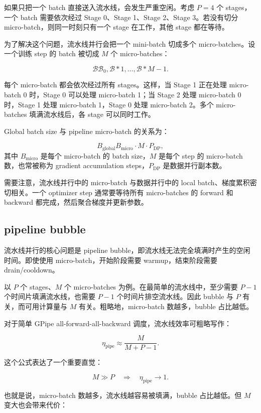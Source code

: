 如果只把一个 batch 直接送入流水线，会发生严重空闲。考虑 $P=4$ 个 stages，一个 batch 需要依次经过 Stage 0、Stage 1、Stage 2、Stage 3。若没有切分 micro-batch，则同一时刻只有一个 stage 在工作，其他 stage 都在等待。

为了解决这个问题，流水线并行会把一个 mini-batch 切成多个 micro-batches。设一个训练 step 的 batch 被切成 $M$ 个 micro-batches：

\[
\mathcal{B}
{\mathcal{B}_0,\mathcal{B}*1,\ldots,\mathcal{B}*{M-1}}.
\]

每个 micro-batch 都会依次经过所有 stages。这样，当 Stage 1 正在处理 micro-batch 0 时，Stage 0 可以处理 micro-batch 1；当 Stage 2 处理 micro-batch 0 时，Stage 1 处理 micro-batch 1，Stage 0 处理 micro-batch 2。多个 micro-batches 填满流水线后，各 stage 可以同时工作。

Global batch size 与 pipeline micro-batch 的关系为：

\[
B_{\mathrm{global}}
B_{\mathrm{micro}}
\cdot
M
\cdot
P_{\mathrm{DP}},
\]
其中 $B_{\mathrm{micro}}$ 是每个 micro-batch 的 batch size，$M$ 是每个 step 的 micro-batch 数，也常被称为 gradient accumulation steps，$P_{\mathrm{DP}}$ 是数据并行副本数。

需要注意，流水线并行中的 micro-batch 与数据并行中的 local batch、梯度累积密切相关。一个 optimizer step 通常要等待所有 micro-batches 的 forward 和 backward 都完成，然后聚合梯度并更新参数。

\subsection{pipeline bubble}
\label{subsec:pipeline-bubble}

流水线并行的核心问题是 pipeline bubble，即流水线无法完全填满时产生的空闲时间。即使使用 micro-batch，开始阶段需要 warmup，结束阶段需要 drain/cooldown。

以 $P$ 个 stages、$M$ 个 micro-batches 为例。在最简单的流水线中，至少需要 $P-1$ 个时间片填满流水线，也需要 $P-1$ 个时间片排空流水线。因此 bubble 与 $P$ 有关，而可用计算量与 $M$ 有关。粗略地，micro-batch 数越多，bubble 占比越低。

对于简单 GPipe all-forward-all-backward 调度，流水线效率可粗略写作：

\[
\eta_{\mathrm{pipe}}
\approx
\frac{M}{M+P-1}.
\]

这个公式表达了一个重要直觉：

\[
M\gg P
\quad
\Rightarrow
\quad
\eta_{\mathrm{pipe}}\rightarrow 1.
\]

也就是说，micro-batch 数越多，流水线越容易被填满，bubble 占比越低。但 $M$ 变大也会带来代价：

